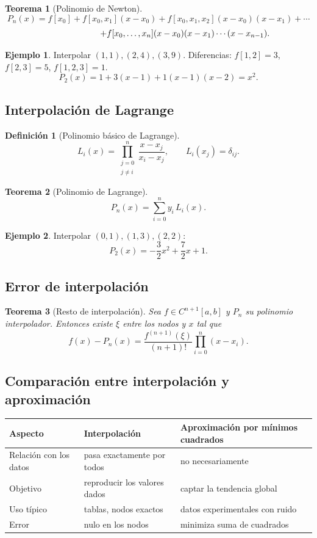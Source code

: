\documentclass[a4paper,12pt]{article}
\theoremstyle{definition}
\newtheorem{definicion}{Definición}[section]
\newtheorem{ejemplo}{Ejemplo}[section]
\theoremstyle{plain}
\newtheorem{teorema}{Teorema}[section]
\begin{document}
\begin{teorema}[Polinomio de Newton]
\[
P_n(x)=f[x_0]+f[x_0,x_1](x-x_0)+f[x_0,x_1,x_2](x-x_0)(x-x_1)+\cdots
\]
\[
\hspace{2.2cm}
+f[x_0,\dots,x_n](x-x_0)(x-x_1)\cdots(x-x_{n-1}).
\]
\end{teorema}

\begin{ejemplo}
Interpolar $(1,1),(2,4),(3,9)$.
Diferencias: $f[1,2]=3$, $f[2,3]=5$, $f[1,2,3]=1$.
\[
P_2(x)=1+3(x-1)+1(x-1)(x-2)=x^2.
\]
\end{ejemplo}

\subsection{Interpolación de Lagrange}

\begin{definicion}[Polinomio básico de Lagrange]
\[
L_i(x)=\prod_{\substack{j=0\\ j\neq i}}^n \frac{x-x_j}{x_i-x_j},
\qquad L_i(x_j)=\delta_{ij}.
\]
\end{definicion}

\begin{teorema}[Polinomio de Lagrange]
\[
P_n(x)=\sum_{i=0}^n y_i\,L_i(x).
\]
\end{teorema}

\begin{ejemplo}
Interpolar $(0,1),(1,3),(2,2)$:
\[
P_2(x) = -\frac{3}{2}x^2+\frac{7}{2}x+1.
\]
\end{ejemplo}

\subsection{Error de interpolación}

\begin{teorema}[Resto de interpolación]
Sea $f\in C^{n+1}[a,b]$ y $P_n$ su polinomio interpolador. Entonces existe
$\xi$ entre los nodos y $x$ tal que
\[
f(x)-P_n(x)=\frac{f^{(n+1)}(\xi)}{(n+1)!}\prod_{i=0}^n (x-x_i).
\]
\end{teorema}

\subsection{Comparación entre interpolación y aproximación}

\begin{center}
\begin{tabular}{p{4cm}p{5cm}p{5cm}}
\toprule
Aspecto & Interpolación & Aproximación por mínimos cuadrados \\
\midrule
Relación con los datos & pasa exactamente por todos & no necesariamente \\
Objetivo & reproducir los valores dados & captar la tendencia global \\
Uso típico & tablas, nodos exactos & datos experimentales con ruido \\
Error & nulo en los nodos & minimiza suma de cuadrados \\
\bottomrule
\end{tabular}
\end{center}
\end{document}
